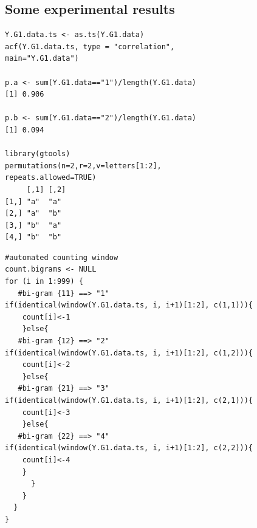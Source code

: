 \documentclass[
paper=128mm:96mm, %
fontsize=11pt, %
pagesize, %
parskip=half-, %
]{scrartcl} %
\theoremstyle{mythmstyle} %
\begin{document}
\clearpage
\subsection{Some experimental results}
\tiny 
\begin{multicols}{2}
\begin{verbatim}
Y.G1.data.ts <- as.ts(Y.G1.data)
acf(Y.G1.data.ts, type = "correlation", 
main="Y.G1.data")

p.a <- sum(Y.G1.data=="1")/length(Y.G1.data)
[1] 0.906

p.b <- sum(Y.G1.data=="2")/length(Y.G1.data)
[1] 0.094

library(gtools)	
permutations(n=2,r=2,v=letters[1:2],
repeats.allowed=TRUE)
     [,1] [,2]
[1,] "a"  "a" 
[2,] "a"  "b" 
[3,] "b"  "a" 
[4,] "b"  "b"
\end{verbatim}
\vfill
\columnbreak
\begin{verbatim}
#automated counting window
count.bigrams <- NULL
for (i in 1:999) {
   #bi-gram {11} ==> "1"
if(identical(window(Y.G1.data.ts, i, i+1)[1:2], c(1,1))){
	count[i]<-1
	}else{
   #bi-gram {12} ==> "2"
if(identical(window(Y.G1.data.ts, i, i+1)[1:2], c(1,2))){
	count[i]<-2
	}else{
   #bi-gram {21} ==> "3"	
if(identical(window(Y.G1.data.ts, i, i+1)[1:2], c(2,1))){
	count[i]<-3
	}else{
   #bi-gram {22} ==> "4"
if(identical(window(Y.G1.data.ts, i, i+1)[1:2], c(2,2))){
	count[i]<-4
	}
      }
    }
  }
}
\end{verbatim}
\end{multicols}

\clearpage
\end{document}
